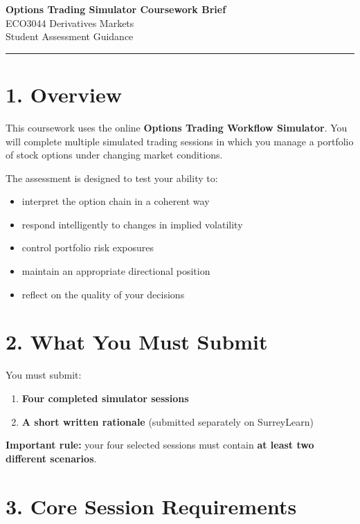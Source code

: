 \documentclass[11pt,a4paper]{article}
\begin{document}
\begin{center}
{\Large \textbf{Options Trading Simulator Coursework Brief}}\\[0.4em]
{\large ECO3044 Derivatives Markets}\\[0.4em]
{\large Student Assessment Guidance}
\end{center}

\hrule
\vspace{1em}

\section*{1. Overview}

This coursework uses the online \textbf{Options Trading Workflow Simulator}. You will complete multiple simulated trading sessions in which you manage a portfolio of stock options under changing market conditions.

The assessment is designed to test your ability to:
\begin{itemize}[leftmargin=1.5em]
\item interpret the option chain in a coherent way
\item respond intelligently to changes in implied volatility
\item control portfolio risk exposures
\item maintain an appropriate directional position
\item reflect on the quality of your decisions
\end{itemize}

\section*{2. What You Must Submit}

You must submit:
\begin{enumerate}[leftmargin=1.5em]
\item \textbf{Four completed simulator sessions}
\item \textbf{A short written rationale} (submitted separately on SurreyLearn)
\end{enumerate}

\textbf{Important rule:} your four selected sessions must contain \textbf{at least two different scenarios}.

\section*{3. Core Session Requirements}
\end{document}
